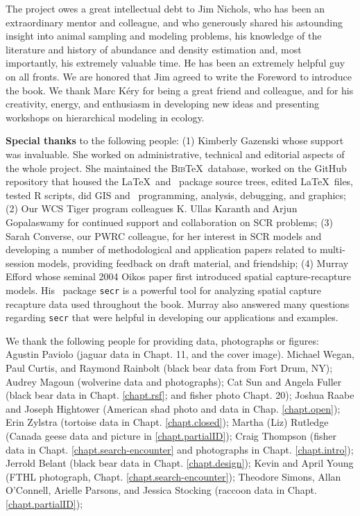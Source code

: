 
The project owes a great intellectual debt to Jim Nichols, who has
been an extraordinary mentor and colleague,
and who generously shared his
astounding insight into animal sampling and modeling problems, his
knowledge
of the literature and history of abundance and density estimation
and, most importantly, his extremely valuable time.
He has
been
an 
extremely helpful guy on all fronts. We are honored that Jim
agreed to write the Foreword to introduce the book. 
 We thank Marc K\'{e}ry
for being a great friend and colleague, and for his creativity, 
energy, and enthusiasm in developing new ideas and
presenting workshops on hierarchical modeling in ecology.

{\bf Special thanks} to the following people: (1) Kimberly Gazenski whose support was
invaluable. She worked on administrative, technical and editorial
aspects of the whole project. She maintained the \textsc{Bib}\TeX~database,
worked on the GitHub repository that housed the \LaTeX~and \R~package
source trees, edited \LaTeX~files, tested R scripts, did GIS and
\R~programming, analysis, debugging, and graphics;  (2) Our WCS Tiger
program colleagues K. Ullas Karanth and Arjun Gopalaswamy for
continued support and collaboration on SCR problems;  (3) Sarah
Converse, our PWRC colleague, for her interest in SCR models and
developing a number of methodological and application papers related
to multi-session models, providing feedback on draft material, and
friendship;  (4) Murray Efford whose seminal 2004 Oikos paper first introduced spatial
capture-recapture models.  His \R~package \mbox{\tt secr} 
is a powerful tool for analyzing
spatial capture recapture data used
throughout the book. Murray also answered many questions regarding \mbox{\tt secr} that 
were helpful in developing our applications and examples.

We thank the following people for providing data, photographs or figures:
Agustin Paviolo (jaguar data in Chapt. 11, and the cover image).
Michael Wegan, Paul Curtis, and Raymond Rainbolt (black bear data from Fort Drum, NY);
Audrey Magoun (wolverine data and photographs); 
Cat Sun and Angela Fuller (black bear data in Chapt. \ref{chapt.rsf};
and fisher photo Chapt. 20); 
Joshua Raabe and Joseph Hightower (American shad photo and data in
Chap. \ref{chapt.open}); 
Erin Zylstra (tortoise data in Chapt. \ref{chapt.closed}); 
Martha (Liz) Rutledge (Canada geese data and picture in
\ref{chapt.partialID});  
Craig Thompson (fisher data in Chapt. \ref{chapt.search-encounter} and
photographs in Chapt. \ref{chapt.intro});
Jerrold Belant (black bear data in Chapt. \ref{chapt.design}); 
Kevin and April Young (FTHL photograph,
Chapt. \ref{chapt.search-encounter});
Theodore Simons, Allan O'Connell, Arielle Parsons, and Jessica Stocking (raccoon data in Chapt.
\ref{chapt.partialID}); 


